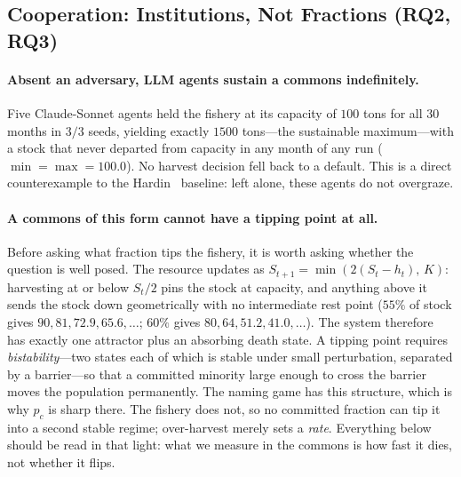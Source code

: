 \documentclass[manuscript,screen,review]{acmart}
\begin{document}
\subsection{Cooperation: Institutions, Not Fractions (RQ2, RQ3)}
\label{sec:coop}
\paragraph{Absent an adversary, LLM agents sustain a commons indefinitely.}
Five Claude-Sonnet agents held the fishery at its capacity of $100$ tons for all
$30$ months in $3/3$ seeds, yielding exactly $1500$ tons---the sustainable
maximum---with a stock that never departed from capacity in any month of any run
($\min=\max=100.0$). No harvest decision fell back to a default. This is a direct
counterexample to the Hardin~\cite{hardin1968} baseline: left alone, these agents
do not overgraze.

\paragraph{A commons of this form cannot have a tipping point at all.} Before
asking what fraction tips the fishery, it is worth asking whether the question is
well posed. The resource updates as $S_{t+1}=\min\!\left(2(S_t-h_t),\,K\right)$:
harvesting at or below $S_t/2$ pins the stock at capacity, and anything above it
sends the stock down geometrically with no intermediate rest point ($55\%$ of
stock gives $90,81,72.9,65.6,\dots$; $60\%$ gives $80,64,51.2,41.0,\dots$). The
system therefore has exactly one attractor plus an absorbing death state. A
tipping point requires \emph{bistability}---two states each of which is stable
under small perturbation, separated by a barrier---so that a committed minority
large enough to cross the barrier moves the population permanently. The naming
game has this structure, which is why $p_c$ is sharp there. The fishery does not,
so no committed fraction can tip it into a second stable regime; over-harvest
merely sets a \emph{rate}. Everything below should be read in that light: what we
measure in the commons is how fast it dies, not whether it flips.
\end{document}
